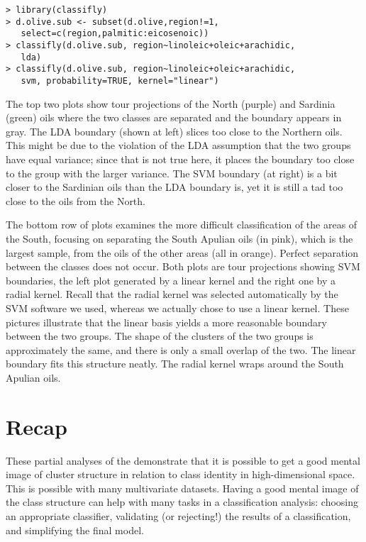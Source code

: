 \begin{verbatim}
> library(classifly)
> d.olive.sub <- subset(d.olive,region!=1,
   select=c(region,palmitic:eicosenoic))
> classifly(d.olive.sub, region~linoleic+oleic+arachidic, 
   lda)
> classifly(d.olive.sub, region~linoleic+oleic+arachidic, 
   svm, probability=TRUE, kernel="linear")
\end{verbatim}

The top two plots show tour projections of the North (purple) and
Sardinia (green) oils where the two classes are separated and the
boundary appears in gray.  The LDA boundary (shown at left) slices too
close to the Northern oils. This might be due to the violation of the
LDA assumption that the two groups have equal variance; since that is
not true here, it places the boundary too close to the group with the
larger variance.  The SVM boundary (at right) is a bit closer to the
Sardinian oils than the LDA boundary is, yet it is still a tad too
close to the oils from the North.

The bottom row of plots examines the more difficult classification of
the areas of the South, focusing on separating the South Apulian oils
(in pink), which is the largest sample, from the oils of the other
areas (all in orange). Perfect separation between the classes does not
occur. Both plots are tour projections showing SVM boundaries, the
left plot generated by a linear kernel and the right one by a radial
kernel.  Recall that the radial kernel was selected automatically by
the SVM software we used, whereas we actually chose to use a linear
kernel.  These pictures illustrate that the linear basis yields a more
reasonable boundary between the two groups. The shape of the clusters
of the two groups is approximately the same, and there is only a small
overlap of the two. The linear boundary fits this structure
neatly. The radial kernel wraps around the South Apulian oils.

\section{Recap}

% 


These partial analyses of the  demonstrate
that it is possible to get a good mental image of cluster structure in
relation to class identity in high-dimensional space.  This is
possible with many multivariate datasets. Having a good mental image
of the class structure can help with many tasks in a classification
analysis: choosing an appropriate classifier, validating (or
rejecting!) the results of a classification, and simplifying the final
model.

